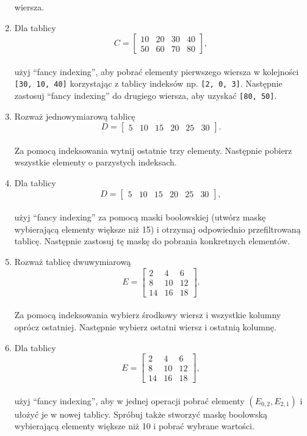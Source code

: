 \documentclass[
  polish,
  letterpaper,
  DIV=11,
  numbers=noendperiod]{scrreprt}
\begin{document}
\begin{enumerate}
  wiersza.
\item
  Dla tablicy\\
  \[C = \begin{bmatrix}10 & 20 & 30 & 40 \\ 50 & 60 & 70 & 80\end{bmatrix},\]\\
  użyj ``fancy indexing'', aby pobrać elementy pierwszego wiersza w
  kolejności \texttt{{[}30,\ 10,\ 40{]}} korzystając z tablicy indeksów
  np. \texttt{{[}2,\ 0,\ 3{]}}. Następnie zastosuj ``fancy indexing'' do
  drugiego wiersza, aby uzyskać \texttt{{[}80,\ 50{]}}.
\item
  Rozważ jednowymiarową tablicę\\
  \[D = \begin{bmatrix}5 & 10 & 15 & 20 & 25 & 30\end{bmatrix}.\]\\
  Za pomocą indeksowania wytnij ostatnie trzy elementy. Następnie
  pobierz wszystkie elementy o parzystych indeksach.
\item
  Dla tablicy\\
  \[D = \begin{bmatrix}5 & 10 & 15 & 20 & 25 & 30\end{bmatrix},\]\\
  użyj ``fancy indexing'' za pomocą maski boolowskiej (utwórz maskę
  wybierającą elementy większe niż 15) i otrzymaj odpowiednio
  przefiltrowaną tablicę. Następnie zastosuj tę maskę do pobrania
  konkretnych elementów.
\item
  Rozważ tablicę dwuwymiarową\\
  \[E = \begin{bmatrix}2 & 4 & 6 \\ 8 & 10 & 12 \\ 14 & 16 & 18\end{bmatrix}.\]\\
  Za pomocą indeksowania wybierz środkowy wiersz i wszystkie kolumny
  oprócz ostatniej. Następnie wybierz ostatni wiersz i ostatnią kolumnę.
\item
  Dla tablicy\\
  \[E = \begin{bmatrix}2 & 4 & 6 \\ 8 & 10 & 12 \\ 14 & 16 & 18\end{bmatrix},\]\\
  użyj ``fancy indexing'', aby w jednej operacji pobrać elementy
  \((E_{0,2}, E_{2,1})\) i ułożyć je w nowej tablicy. Spróbuj także
  stworzyć maskę boolowską wybierającą elementy większe niż 10 i pobrać
  wybrane wartości.
\end{enumerate}
\end{document}
